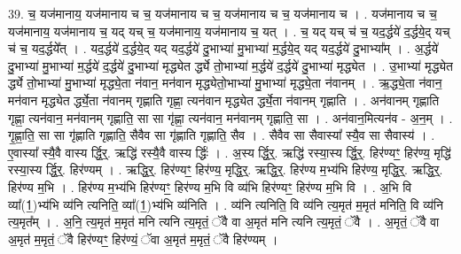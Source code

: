 \documentclass[17pt]{extarticle}
\begin{document}
39. च॒ यज॑मानाय॒ यज॑मानाय च च॒ यज॑मानाय च च॒ यज॑मानाय च च॒ यज॑मानाय च । . यज॑मानाय च च॒ यज॑मानाय॒ यज॑मानाय च॒ यद् यच् च॒ यज॑मानाय॒ यज॑मानाय च॒ यत् । . च॒ यद् यच् च॑ च॒ यद॒र्द्धये॑ द॒र्द्धये॒द् यच् च॑ च॒ यद॒र्द्धये᳚त् । . यद॒र्द्धये॑ द॒र्द्धये॒द् यद् यद॒र्द्धये॑ दु॒भाभ्या॑ मु॒भाभ्या॑ म॒र्द्धये॒द् यद् यद॒र्द्धये॑ दु॒भाभ्या᳚म् । . अ॒र्द्धये॑ दु॒भाभ्या॑ मु॒भाभ्या॑ म॒र्द्धये॑ द॒र्द्धये॑ दु॒भाभ्या॑ मृद्ध्येत र्द्ध्ये तो॒भाभ्या॑ म॒र्द्धये॑ द॒र्द्धये॑ दु॒भाभ्या॑ मृद्ध्येत । . उ॒भाभ्या॑ मृद्ध्येत र्द्ध्ये तो॒भाभ्या॑ मु॒भाभ्या॑ मृद्ध्ये॒ता न॑वान॒ मन॑वान मृद्ध्येतो॒भाभ्या॑ मु॒भाभ्या॑ मृद्ध्ये॒ता न॑वानम् । . ऋ॒द्ध्ये॒ता न॑वान॒ मन॑वान मृद्ध्येत र्द्ध्ये॒ता न॑वानम् गृह्णाति गृह्णा॒ त्यन॑वान मृद्ध्येत र्द्ध्ये॒ता न॑वानम् गृह्णाति । . अन॑वानम् गृह्णाति गृह्णा॒ त्यन॑वान॒ मन॑वानम् गृह्णाति॒ सा सा गृ॑ह्णा॒ त्यन॑वान॒ मन॑वानम् गृह्णाति॒ सा । . अन॑वान॒मित्यन॑व - अ॒न॒म् । . गृ॒ह्णा॒ति॒ सा सा गृ॑ह्णाति गृह्णाति॒ सैवैव सा गृ॑ह्णाति गृह्णाति॒ सैव । . सैवैव सा सैवास्या᳚ स्यै॒व सा सैवास्य॑ । . ए॒वास्या᳚ स्यै॒वै वास्य र्द्धि॒र्॒. ऋद्धि॑ रस्यै॒वै वास्य र्द्धिः॑ । . अ॒स्य र्द्धि॒र्॒. ऋद्धि॑ रस्या॒स्य र्द्धि॒र्॒. हिर॑ण्यꣳ॒॒ हिर॑ण्य॒ मृद्धि॑ रस्या॒स्य र्द्धि॒र्॒. हिर॑ण्यम् । . ऋद्धि॒र्॒. हिर॑ण्यꣳ॒॒ हिर॑ण्य॒ मृद्धि॒र्॒. ऋद्धि॒र्॒. हिर॑ण्य म॒भ्य॑भि हिर॑ण्य॒ मृद्धि॒र्॒. ऋद्धि॒र्॒. हिर॑ण्य म॒भि । . हिर॑ण्य म॒भ्य॑भि हिर॑ण्यꣳ॒॒ हिर॑ण्य म॒भि वि व्य॑भि हिर॑ण्यꣳ॒॒ हिर॑ण्य म॒भि वि । . अ॒भि वि व्या᳚(1॒)भ्य॑भि व्य॑नि त्यनिति॒ व्या᳚(1॒)भ्य॑भि व्य॑निति । . व्य॑नि त्यनिति॒ वि व्य॑नि त्य॒मृत॑ म॒मृत॑ मनिति॒ वि व्य॑नि त्य॒मृत᳚म् । . अ॒नि॒ त्य॒मृत॑ म॒मृत॑ मनि त्यनि त्य॒मृतं॒ ॅवै वा अ॒मृत॑ मनि त्यनि त्य॒मृतं॒ ॅवै । . अ॒मृतं॒ ॅवै वा अ॒मृत॑ म॒मृतं॒ ॅवै हिर॑ण्यꣳ॒॒ हिर॑ण्यं॒ ॅवा अ॒मृत॑ म॒मृतं॒ ॅवै हिर॑ण्यम् । \newline
\end{document}
